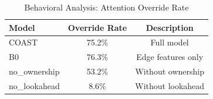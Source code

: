 \begin{table}[t]
\centering\caption{Behavioral Analysis: Attention Override Rate}\label{tab:behavioral}
\begin{tabular}{lcc}\toprule
Model & Override Rate & Description \\ \midrule
COAST & 75.2\% & Full model \\
B0 & 76.3\% & Edge features only \\
no\_ownership & 53.2\% & Without ownership \\
no\_lookahead & 8.6\% & Without lookahead \\ \bottomrule
\end{tabular}\end{table}